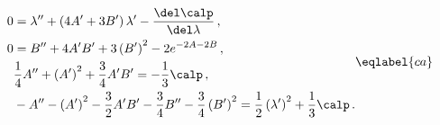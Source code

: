\begin{equation}
\begin{split}
0&=\lambda''+\left(4 A'+3 B'\right) \lambda' -\frac{\del \calp}{\del
\lambda}\,,\\
0&=B''+4 A' B'+3\left(B'\right)^2-2 e^{-2 A -2 B}\,,\\
&\frac 14 A''+\left(A'\right)^2+\frac 34 A' B'=-\frac 13 \calp\,,\\
&- A''-\left(A'\right)^2-\frac 32 A' B'-\frac 34 B''-\frac 34 
\left(B'\right)^2=\frac 12 \left(\lambda'\right)^2 +\frac 13 \calp\,.
\end{split}
\eqlabel{ca} 
\end{equation}

